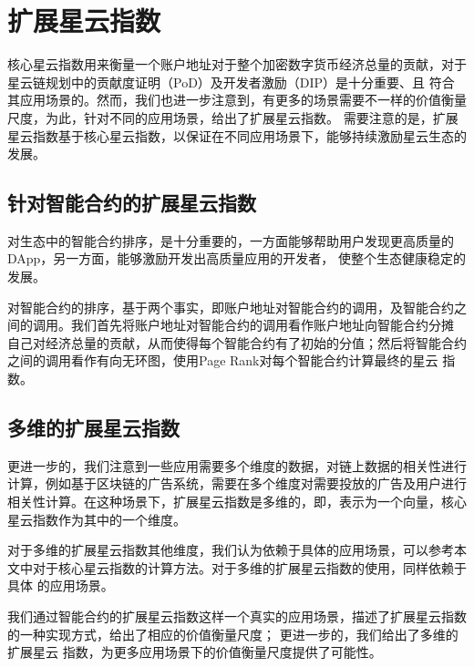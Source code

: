 \section{扩展星云指数}
核心星云指数用来衡量一个账户地址对于整个加密数字货币经济总量的贡献，对于星云链规划中的贡献度证明（PoD）及开发者激励（DIP）是十分重要、且
符合其应用场景的。然而，我们也进一步注意到，有更多的场景需要不一样的价值衡量尺度，为此，针对不同的应用场景，给出了扩展星云指数。
需要注意的是，扩展星云指数基于核心星云指数，以保证在不同应用场景下，能够持续激励星云生态的发展。

\subsection{针对智能合约的扩展星云指数}
对生态中的智能合约排序，是十分重要的，一方面能够帮助用户发现更高质量的DApp，另一方面，能够激励开发出高质量应用的开发者，
使整个生态健康稳定的发展。

对智能合约的排序，基于两个事实，即账户地址对智能合约的调用，及智能合约之间的调用。我们首先将账户地址对智能合约的调用看作账户地址向智能合约分摊
自己对经济总量的贡献，从而使得每个智能合约有了初始的分值；然后将智能合约之间的调用看作有向无环图，使用Page Rank对每个智能合约计算最终的星云
指数。


\subsection{多维的扩展星云指数}
更进一步的，我们注意到一些应用需要多个维度的数据，对链上数据的相关性进行计算，例如基于区块链的广告系统，需要在多个维度对需要投放的广告及用户进行
相关性计算。在这种场景下，扩展星云指数是多维的，即，表示为一个向量，核心星云指数作为其中的一个维度。

对于多维的扩展星云指数其他维度，我们认为依赖于具体的应用场景，可以参考本文中对于核心星云指数的计算方法。对于多维的扩展星云指数的使用，同样依赖于具体
的应用场景。

\vspace{2em}

我们通过智能合约的扩展星云指数这样一个真实的应用场景，描述了扩展星云指数的一种实现方式，给出了相应的价值衡量尺度；
更进一步的，我们给出了多维的扩展星云
指数，为更多应用场景下的价值衡量尺度提供了可能性。
